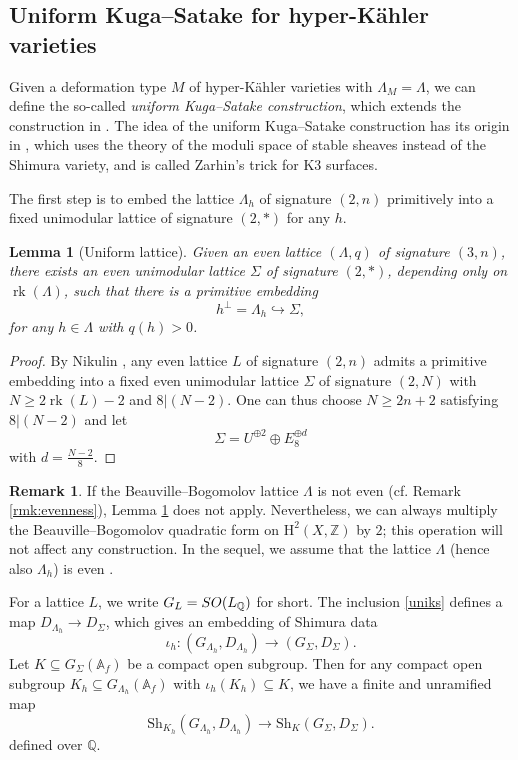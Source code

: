 \documentclass[11pt,reqno,oneside]{amsart}
\numberwithin{equation}{section}
\newtheorem{lemma}[theorem]{Lemma}
\theoremstyle{definition}
\newtheorem{remark}[theorem]{Remark}
\DeclareMathOperator{\rk}{rk}
\newcommand{\SO}{{\rm SO}}
\newcommand{\Sh}{\mathrm{Sh}}
\newcommand\rH{\mathrm{H}}
\newcommand{\QQ}{\mathbb{Q}}
\newcommand{\ZZ}{\mathbb{Z}}
\begin{document}
\subsection{Uniform Kuga--Satake for hyper-Kähler varieties}
\label{subsec:UniformKS}
Given a deformation type $M$ of hyper-Kähler varieties  with $\Lambda_M=\Lambda$, we can define the so-called \textit{uniform Kuga--Satake construction}, which extends the construction in \cite{Sh17}. 
The idea of the uniform Kuga--Satake construction has its origin in \cite{Ch16}, which uses the theory of the moduli space of stable sheaves instead of the Shimura variety, and is called Zarhin's trick for K3 surfaces.

The first step is to embed the lattice $\Lambda_h$ of signature $(2,n)$ primitively into a fixed unimodular lattice of signature $(2,*)$ for any $h$.

\begin{lemma}[Uniform lattice]
\label{lemma:UniformKS}
Given an even lattice $(\Lambda,q)$ of signature $(3,n)$, there exists an even unimodular lattice $\Sigma$ of signature $(2, *)$, depending only on $\rk (\Lambda)$, such that there is a primitive embedding 
\begin{equation}\label{uniks}
h^\perp=\Lambda_h\hookrightarrow \Sigma,
\end{equation}
for any $h\in \Lambda$ with $q(h)>0$. 
\end{lemma}
\begin{proof}
By Nikulin \cite[Theorem 1.12.4]{Ni79}, any even lattice $L$ of signature $(2,n)$ admits a primitive embedding into a fixed  even unimodular lattice $\Sigma$ of signature $(2,N)$ with $N\geq 2\rk (L)-2$ and $8|(N-2)$. One can thus choose $N\geq 2n+2$ satisfying $8 | (N-2)$ and let $$\Sigma= U^{\oplus 2}\oplus E_8^{\oplus d}$$ with $d=\frac{N-2}{8}$.
\end{proof}

\begin{remark}\label{odd}
If the Beauville--Bogomolov lattice $\Lambda$ is not even (cf. Remark \ref{rmk:evenness}),  Lemma \ref{lemma:UniformKS} does not apply. Nevertheless, we can always multiply the Beauville--Bogomolov quadratic form on $\rH^2(X,\ZZ)$ by $2$; this operation will not affect any construction. 
In the sequel, we assume that the lattice $\Lambda$ (hence also $\Lambda_h$) is even .
\end{remark}

For a lattice $L$, we write 
$G_L=\SO(L_{\QQ})$ for short. The inclusion \eqref{uniks} defines a map $D_{\Lambda_h} \rightarrow D_{\Sigma}$, which gives an embedding of Shimura data 
$$\iota_h : (G_{\Lambda_h}, D_{\Lambda_h}) \rightarrow (G_{\Sigma}, D_{\Sigma}).$$ 
Let $K \subseteq G_\Sigma(\mathbb{A}_f)$ be a compact open subgroup. Then for any compact open subgroup $K_{h}\subseteq G_{\Lambda_h}(\mathbb{A}_f)$ with $\iota_h (K_{h}) \subseteq K$, we have a finite and unramified map 
\begin{equation} \label{uKS1}
\Sh_{K_h} (G_{\Lambda_h}, D_{\Lambda_h}) \rightarrow \Sh_K(G_\Sigma, D_{\Sigma}).
\end{equation}
defined over $\QQ$. 
\end{document}
